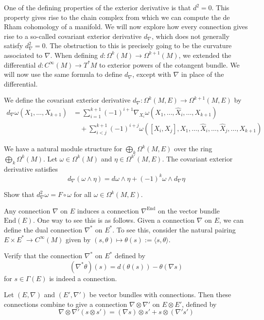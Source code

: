 One of the defining properties of the exterior derivative is that $d^2=0$. This property gives rise to the chain complex from which we can compute the de Rham cohomology of a manifold. We will now explore how every connection gives rise to a so-called covariant exterior derivative $d_\nabla$, which does not generally satisfy $d_\nabla^2=0$. The obstruction to this is precisely going to be the curvature associated to $\nabla$. When defining $d:\Omega^k(M)\to\Omega^{k+1}(M)$, we extended the differential $d:C^\infty(M)\to T^*M$ to exterior powers of the cotangent bundle. We will now use the same formula to define $d_\nabla$, except with $\nabla$ in place of the differential.
\begin{definition}
  We define the covariant exterior derivative $d_\nabla:\Omega^k(M,E)\to\Omega^{k+1}(M,E)$ by
  \begin{align*}
    d_\nabla\omega(X_1,\dots,X_{k+1}) &= \sum^{k+1}_{i=1}(-1)^{i+1}\nabla_{X_i}\omega(X_1,\dots,\widehat{X}_i,\dots,X_{k+1})\\
                                      &\quad +\sum_{i<j}^{k+1}(-1)^{i+j}\omega([X_i,X_j],X_1,\dots,\widehat{X}_i,\dots,\widehat{X}_j,\dots,X_{k+1})
  \end{align*}
\end{definition}
We have a natural module structure for $\bigoplus_k\Omega^k(M,E)$ over the ring $\bigoplus_k\Omega^k(M)$. Let $\omega\in\Omega^k(M)$ and $\eta\in\Omega^{k'}(M,E)$. The covariant exterior derivative satisfies
$$d_\nabla(\omega\wedge\eta)=d\omega\wedge\eta+(-1)^k\omega\wedge d_\nabla\eta$$
\begin{exercise}
  Show that $d_\nabla^2\omega=F\circ\omega$ for all $\omega\in\Omega^k(M,E)$.
\end{exercise}
Any connection $\nabla$ on $E$ induces a connection $\nabla^\text{End}$ on the vector bundle $\text{End}(E)$. One way to see this is as follows. Given a connection $\nabla$ on $E$, we can define the dual connection $\nabla^*$ on $E^*$. To see this, consider the natural pairing $E\times E^*\to C^\infty(M)$ given by $(s,\theta)\mapsto\theta(s):=\langle s,\theta\rangle$.
\begin{exercise}
  Verify that the connection $\nabla^*$ on $E^*$ defined by
  $$(\nabla^*\theta)(s)=d(\theta(s))-\theta(\nabla s)$$
  for $s\in\Gamma(E)$ is indeed a connection.
\end{exercise}
\begin{proposition}
  Let $(E,\nabla)$ and $(E',\nabla')$ be vector bundles with connections. Then these connections combine to give a connection $\nabla\otimes\nabla'$ on $E\otimes E'$, defined by
  $$\nabla\otimes\nabla'(s\otimes s')=(\nabla s)\otimes s'+s\otimes(\nabla's')$$
\end{proposition}
